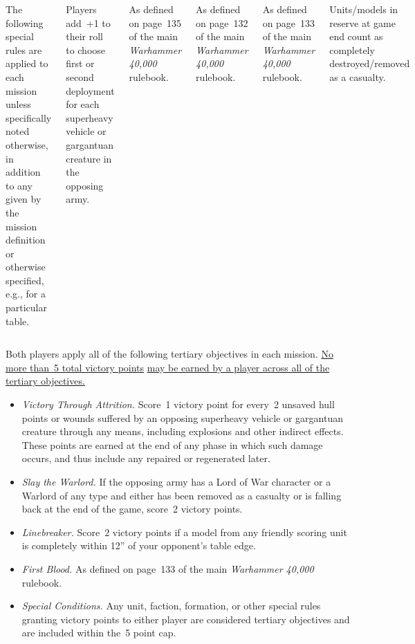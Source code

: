 \begin{columns}
The following special rules are applied to each mission unless
specifically noted otherwise, in addition to any given by the mission
definition or otherwise specified, e.g., for a particular table.

  Players add~+1 to their roll to
choose first or second deployment for each superheavy vehicle or
gargantuan creature in the opposing army.

 As defined on page~135 of the main
\emph{Warhammer 40,000} rulebook.

 As defined on page~132 of
the main \emph{Warhammer 40,000} rulebook.

 As defined on page~133 of
the main \emph{Warhammer 40,000} rulebook.

  Units/models in reserve at game end count
as completely destroyed/removed as a casualty.

\end{columns}


Both players apply all of the following tertiary objectives in each
mission.  \underline{No more than~5 total victory points}
\underline{may be earned by a player across all of the tertiary
  objectives.}

\begin{itemize}
\item \textit{Victory Through Attrition.}  Score~1 victory point for
  every~2 unsaved hull points or wounds suffered by an opposing
  superheavy vehicle or gargantuan creature through any means,
  including explosions and other indirect effects.  These points are
  earned at the end of any phase in which such damage occurs, and thus
  include any repaired or regenerated later.

\item \textit{Slay the Warlord.}  If the opposing army has a Lord of
  War character or a Warlord of any type and either has been removed
  as a casualty or is falling back at the end of the game, score~2
  victory points.

\item \textit{Linebreaker.}  Score~2 victory points if a model from
  any friendly scoring unit is completely within 12'' of your
  opponent's table edge.

\item \textit{First Blood.}  As defined on page~133 of the main
  \emph{Warhammer 40,000} rulebook.

\item \textit{Special Conditions.}  Any unit, faction, formation, or
  other special rules granting victory points to either player are
  considered tertiary objectives and are included within the~5 point
  cap.
\end{itemize}
